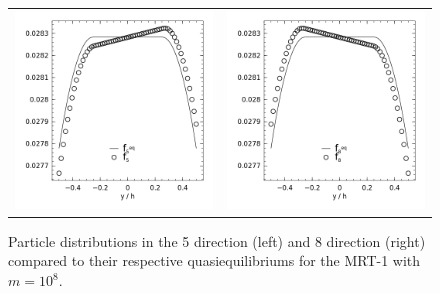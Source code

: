 \begin{figure}
	\centering
    \begin{tabulary}{\linewidth}{c c}
        \includegraphics[width=\figwid]{figs/poise-bingham/mrt/feq-vs-f_5.png}
        &
        \includegraphics[width=\figwid]{figs/poise-bingham/mrt/feq-vs-f_8.png}
    \end{tabulary}
    \caption{Particle distributions in the 5 direction (left) and 8 direction (right) compared to their respective quasiequilibriums for the MRT-1 with $m = 10^8$.}
    \label{fig:feq-vs-f_mrt}
\end{figure}

